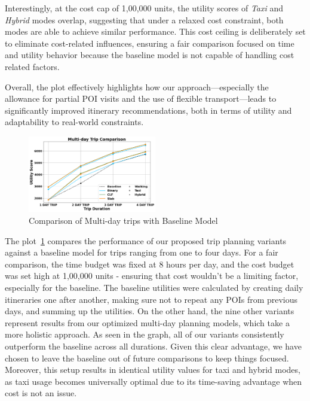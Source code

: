 Interestingly, at the cost cap of 1,00,000 units, the utility scores of \textit{Taxi} and \textit{Hybrid} modes overlap, suggesting that under a relaxed cost constraint, both modes are able to achieve similar performance. This cost ceiling is deliberately set to eliminate cost-related influences, ensuring a fair comparison focused on time and utility behavior because the baseline model is not capable of handling cost related factors.

Overall, the plot effectively highlights how our approach—especially the allowance for partial POI visits and the use of flexible transport—leads to significantly improved itinerary recommendations, both in terms of utility and adaptability to real-world constraints.



\begin{figure}[H]
\includegraphics[width=0.5\textwidth]{plots/baselineComparison_pkj.png}
\caption{Comparison of Multi-day trips with Baseline Model}
\label{fig:comparisonWithBaselinePlot}
\end{figure}

The plot~\ref{fig:comparisonWithBaselinePlot} compares the performance of our proposed trip planning variants against a baseline model for trips ranging from one to four days. For a fair comparison, the time budget was fixed at 8 hours per day, and the cost budget was set high at 1,00,000 units - ensuring that cost wouldn’t be a limiting factor, especially for the baseline. The baseline utilities were calculated by creating daily itineraries one after another, making sure not to repeat any POIs from previous days, and summing up the utilities. On the other hand, the nine other variants represent results from our optimized multi-day planning models, which take a more holistic approach. As seen in the graph, all of our variants consistently outperform the baseline across all durations. Given this clear advantage, we have chosen to leave the baseline out of future comparisons to keep things focused. Moreover, this setup results in identical utility values for taxi and hybrid modes, as taxi usage becomes universally optimal due to its time-saving advantage when cost is not an issue. \\

